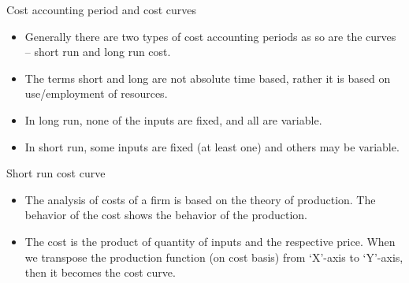 \documentclass[12pt,ignorenonframetext,aspectratio=169]{beamer}
\providecommand{\tightlist}{%
  \setlength{\itemsep}{0pt}\setlength{\parskip}{0pt}}
\begin{document}
\begin{frame}{Cost accounting period and cost curves}
\protect\hypertarget{cost-accounting-period-and-cost-curves}{}
\begin{itemize}
\tightlist
\item
  Generally there are two types of cost accounting periods as so are the
  curves -- short run and long run cost.
\item
  The terms short and long are not absolute time based, rather it is
  based on use/employment of resources.
\item
  In long run, none of the inputs are fixed, and all are variable.
\item
  In short run, some inputs are fixed (at least one) and others may be
  variable.
\end{itemize}
\end{frame}

\begin{frame}{Short run cost curve}
\protect\hypertarget{short-run-cost-curve}{}
\begin{itemize}
\tightlist
\item
  The analysis of costs of a firm is based on the theory of production.
  The behavior of the cost shows the behavior of the production.
\item
  The cost is the product of quantity of inputs and the respective
  price. When we transpose the production function (on cost basis) from
  `X'-axis to `Y'-axis, then it becomes the cost curve.
\end{itemize}
\end{frame}
\end{document}
